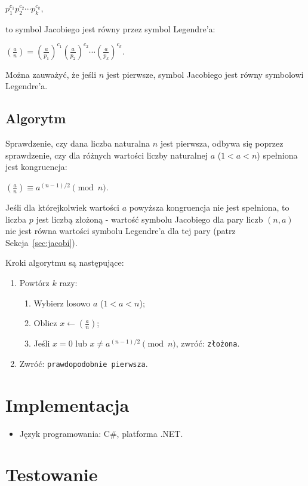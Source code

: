 \documentclass[a4paper,10pt]{article}
\begin{document}
 $p_1^{c_1}p_2^{c_2}\cdots p_k^{c_k}$,
 
 to symbol Jacobiego jest równy przez symbol Legendre'a:
 
 $\left( \frac a n \right) = \left( \frac a {p_1} \right)^{c_1} \left( \frac a {p_2} \right)^{c_2} \cdots \left( \frac a {p_k} \right)^{c_k}$.

 Można zauważyć, że jeśli $n$ jest pierwsze, symbol Jacobiego jest równy symbolowi Legendre'a.
 
 
 \subsection{Algorytm}
 Sprawdzenie, czy dana liczba naturalna $n$ jest pierwsza, odbywa się poprzez sprawdzenie, czy dla różnych wartości liczby naturalnej $a$ ($1 < a < n$) spełniona jest kongruencja:
 
 $\left(\frac{a}{n}\right) \equiv a^{(n-1)/2} \pmod n$.
 
 Jeśli dla którejkolwiek wartości $a$ powyższa kongruencja nie jest spełniona, to liczba $p$ jest liczbą złożoną - wartość symbolu Jacobiego dla pary liczb $(n, a)$  nie jest równa wartości symbolu Legendre'a dla tej pary (patrz Sekcja~\ref{sec:jacobi}).
 
 Kroki algorytmu są następujące:
 
 \begin{enumerate}
  \item Powtórz $k$ razy:
   \begin{enumerate}
    \item Wybierz losowo $a$ ($1 < a < n$);
    \item Oblicz $x \leftarrow \left(\frac{a}{n}\right)$;
    \item Jeśli $x = 0$ lub $x \ne a^{(n-1)/2} \pmod n$, zwróć: \verb+złożona+.
   \end{enumerate}
  \item Zwróć: \verb+prawdopodobnie pierwsza+.
 \end{enumerate}
 


\section{Implementacja}
\begin{itemize}
 \item Język programowania: C\#, platforma  .NET.
\end{itemize}



\section{Testowanie}
\end{document}
